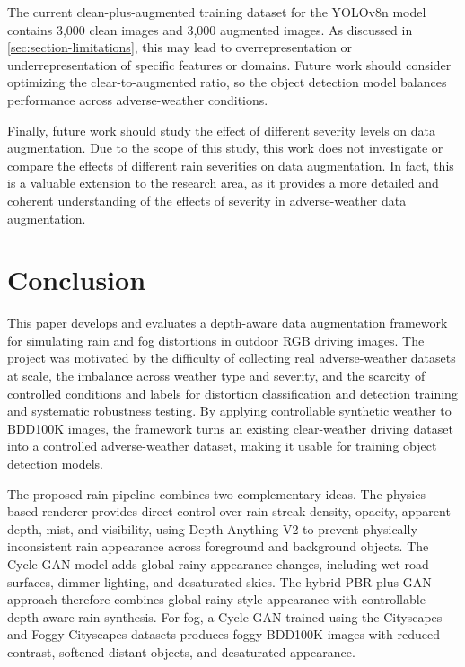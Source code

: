 \documentclass[10pt,letterpaper]{article}
\begin{document}
The current clean-plus-augmented training dataset for the YOLOv8n model contains 3,000 clean images and 3,000 augmented images. As discussed in \autoref{sec:section-limitations}, this may lead to overrepresentation or underrepresentation of specific features or domains.
Future work should consider optimizing the clear-to-augmented ratio, so the object detection model balances performance across adverse-weather conditions.

Finally, future work should study the effect of different severity levels on data augmentation. Due to the scope of this study, this work does not investigate or compare the effects of different rain severities on data augmentation.
In fact, this is a valuable extension to the research area, as it provides a more detailed and coherent understanding of the effects of severity in adverse-weather data augmentation.

\section{Conclusion}

This paper develops and evaluates a depth-aware data augmentation framework for simulating rain and fog distortions in outdoor RGB driving images. 
The project was motivated by the difficulty of collecting real adverse-weather datasets at scale, the imbalance across weather type and severity, and 
the scarcity of controlled conditions and labels for distortion classification and detection training and systematic robustness testing. 
By applying controllable synthetic weather to BDD100K images, the framework turns an existing clear-weather driving dataset into a controlled adverse-weather dataset,
making it usable for training object detection models.

The proposed rain pipeline combines two complementary ideas. The physics-based renderer provides direct control over rain streak density, opacity, 
apparent depth, mist, and visibility, using Depth Anything V2 to prevent physically inconsistent rain appearance across foreground and background objects. 
The Cycle-GAN model adds global rainy appearance changes, including wet road surfaces, dimmer lighting, and desaturated skies. The hybrid PBR plus 
GAN approach therefore combines global rainy-style appearance with controllable depth-aware rain synthesis. For fog, a Cycle-GAN trained using the Cityscapes 
and Foggy Cityscapes datasets produces foggy BDD100K images with reduced contrast, softened distant objects, and desaturated appearance.
\end{document}
